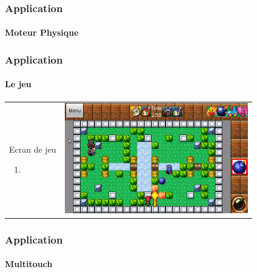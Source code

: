 	\begin{frame}
	\frametitle{Application}
	\framesubtitle{Moteur Physique}
	
	\end{frame}
	
		\begin{frame}
	\frametitle{Application}
	\framesubtitle{Le jeu}
	
		\begin{tabular}{cc}
			\begin{minipage}{3cm}
				Ecran de jeu
				\begin{enumerate}
					\item 
				\end{enumerate}
			\end{minipage} &
			\begin{minipage}{7cm}
				\includegraphics[width=8cm]{img/game.png} 
			\end{minipage}\\
		\end{tabular}
	
	\end{frame}
	
	\begin{frame}
	\frametitle{Application}
	\framesubtitle{Multitouch}
	
	\end{frame}
	
